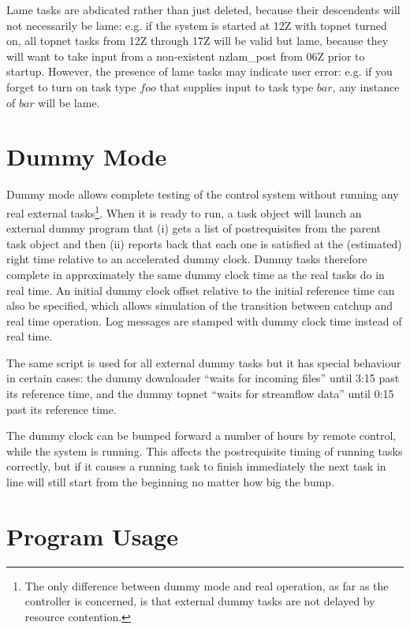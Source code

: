 \documentclass[11pt,a4paper]{report}
\begin{document}
Lame tasks are abdicated rather than just deleted, because their
descendents will not necessarily be lame: e.g. if the system is started
at 12Z with topnet turned on, all topnet tasks from 12Z through 17Z will
be valid but lame, because they will want to take input from a
non-existent nzlam\_post from 06Z prior to startup. However, the
presence of lame tasks may indicate user error: e.g. if you forget
to turn on task type $foo$ that supplies input to task type $bar$,
any instance of $bar$ will be lame.


\chapter{Dummy Mode}

Dummy mode allows complete testing of the control system without running
any real external tasks\footnote{The only difference between dummy mode
and real operation, as far as the controller is concerned, is that
external dummy tasks are not delayed by resource contention.}. When it
is ready to run, a task object will launch an external dummy program
that (i) gets a list of postrequisites from the parent task object and
then (ii) reports back that each one is satisfied at the (estimated)
right time relative to an accelerated dummy clock. Dummy tasks therefore
complete in approximately the same dummy clock time as the real tasks do
in real time. An initial dummy clock offset relative to the initial
reference time can also be specified, which allows simulation of the
transition between catchup and real time operation. Log messages are
stamped with dummy clock time instead of real time.

The same script is used for all external dummy tasks but it has special
behaviour in certain cases: the dummy downloader ``waits for incoming
files'' until 3:15 past its reference time, and the dummy topnet ``waits
for streamflow data'' until 0:15 past its reference time.

The dummy clock can be bumped forward a number of hours by remote
control, while the system is running. This affects the postrequisite
timing of running tasks correctly, but if it causes a running task to
finish immediately the next task in line will still start from the
beginning no matter how big the bump.


\chapter{Program Usage}
\end{document}
